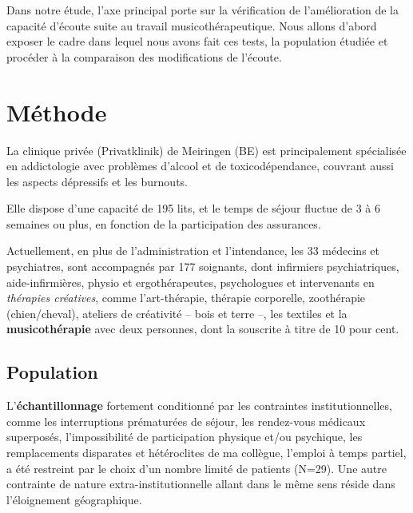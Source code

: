 
Dans notre étude, l'axe principal porte sur la
vérification de l'amélioration de
la capacité d'écoute suite au travail musicothérapeutique.
Nous allons
d'abord exposer le cadre dans lequel nous avons fait ces tests, la
population étudiée et procéder à la comparaison des modifications de
l'écoute.

\section{Méthode}

 La clinique privée (Privatklinik)
de Meiringen (BE) est  principalement spécialisée en
addictologie avec problèmes d'alcool et de toxicodépendance, couvrant aussi les aspects dépressifs
et les
burnouts.


Elle dispose d'une capacité de 195 lits, et le temps de séjour fluctue de 3 à 6 semaines ou plus, en
fonction de la participation des assurances.

Actuellement, en plus de l'administration et l'intendance, les 33
médecins et psychiatres, sont
accompagnés par 177
soignants, dont infirmiers psychiatriques, aide-infirmières, physio et
ergothérapeutes,
psychologues et intervenants en \textit{thérapies
créatives}, comme l'art-thérapie, thérapie
corporelle, zoothérapie (chien/cheval),  ateliers de créativité --
bois et terre --,  les textiles et la\textbf{ musicothérapie} avec deux
personnes, dont la souscrite à titre de 10 pour cent.








\subsection{Population}
L'\textbf{échantillonnage} fortement conditionné par les contraintes
institutionnelles, comme les interruptions prématurées de séjour, les rendez-vous
 médicaux superposés, l'impossibilité de participation physique et/ou
 psychique, les remplacements disparates et hétéroclites de ma
 collègue, l'emploi à
 temps partiel, a été restreint  par le choix d'un nombre limité de
 patients (N=29).
Une autre contrainte de nature extra-institutionnelle allant dans le
même sens réside dans l'éloignement géographique.

